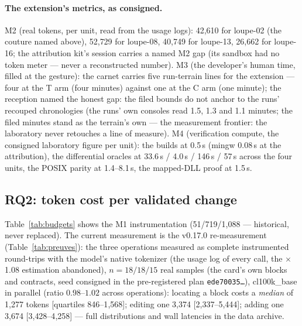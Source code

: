 \documentclass[11pt,a4paper]{article}
\newcommand{\code}[1]{\texttt{\small #1}}
\begin{document}
\paragraph{The extension's metrics, as consigned.} M2 (real tokens,
per unit, read from the usage logs): 42{,}610 for loupe-02 (the
couture named above), 52{,}729 for loupe-08, 40{,}749 for loupe-13,
26{,}662 for loupe-16; the attribution kit's session carries a named
M2 gap (its sandbox had no token meter --- never a reconstructed
number). M3 (the developer's human time, filled at the gesture): the
carnet carries five run-terrain lines for the extension --- four at
the T arm (four minutes) against one at the C arm (one minute); the
reception named the honest gap: the filed bounds do not anchor to the
runs' recouped chronologies (the runs' own consoles read 1.5, 1.3 and
1.1 minutes; the filed minutes stand as the terrain's own --- the
measurement frontier: the laboratory never retouches a line of
measure). M4 (verification compute, the consigned laboratory figure
per unit): the builds at 0.5\,s (mingw 0.08\,s at the attribution),
the differential oracles at 33.6\,s / 4.0\,s / 146\,s / 57\,s
across the four units, the POSIX parity at 1.4--8.1\,s, the
mapped-DLL proof at 1.5\,s.



\subsection{RQ2: token cost per validated change}\label{sec:rq2}

Table~\ref{tab:budgets} shows the M1 instrumentation (51/719/1{,}088 ---
historical, never replaced). The current measurement is the v0.17.0
re-measurement (Table~\ref{tab:preuves}): the three operations measured
as complete instrumented round-trips with the model's native tokenizer
(the usage log of every call, the $\times$1.08 estimation abandoned),
$n{=}18/18/15$ real samples (the card's own blocks and contracts, seed
consigned in the pre-registered plan \code{ede70035\ldots}),
cl100k\_base in parallel (ratio $0.98$--$1.02$ across operations):
locating a block costs a \emph{median} of 1{,}277 tokens [quartiles
846--1{,}568]; editing one 3{,}374 [2{,}337--5{,}444]; adding one 3{,}674
[3{,}428--4{,}258] --- full distributions and wall latencies in the data
archive.
\end{document}
